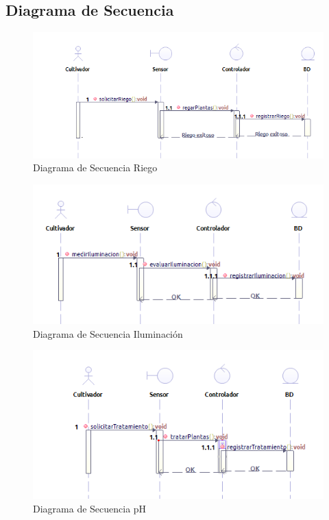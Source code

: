 \subsection{Diagrama de Secuencia}

\newpage

\begin{figure}[h!]
	\centering
	\includegraphics[width=1.0\linewidth]{proyecto/imgs/SecuenciaRiego}
	\caption{Diagrama de Secuencia Riego}
	\label{fig:secuenciariego}
\end{figure}

\begin{figure}[h!]
	\centering
	\includegraphics[width=1.0\linewidth]{proyecto/imgs/SecuenciaIluminacion}
	\caption{Diagrama de Secuencia Iluminación}
	\label{fig:secuenciailuminacion}
\end{figure}

\begin{figure}[h!]
	\centering
	\includegraphics[width=1.0\linewidth]{proyecto/imgs/SecuenciaTierra}
	\caption{Diagrama de Secuencia pH}
	\label{fig:secuenciatierra}
\end{figure}

